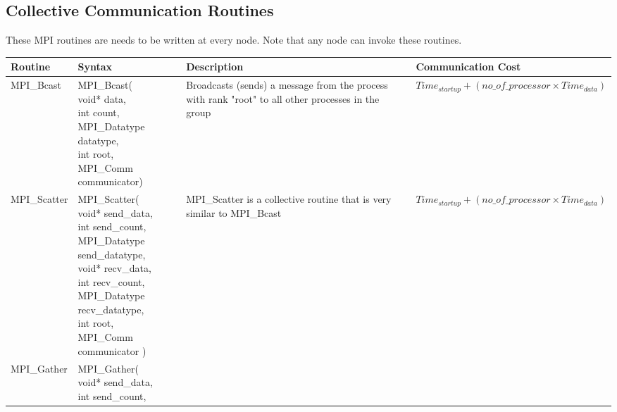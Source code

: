 \subsection{Collective Communication Routines}
These MPI routines are needs to be written at every node. Note that any node can invoke these routines.
\begin{table}[h]
    \hspace{-2cm}
    \begin{tabular}{l | p{5.5cm} | p{5cm} | p{4cm}}
         \textbf{Routine} &  \textbf{Syntax} & \textbf{Description} & \textbf{Communication Cost}
         \\ \hline
         \hline 
            MPI\_Bcast
            & \makecell[tl]{
            MPI\_Bcast(
                \\ void* data,
                \\ int count,
                \\ MPI\_Datatype datatype,
                \\ int root,
                \\ MPI\_Comm communicator)
            }
            & Broadcasts (sends) a message from the process with rank "root" to all other processes in the group
            & $ Time_{startup} + (no\_of\_processor \times Time_{data}) $
        \\ \hline
            MPI\_Scatter
            & \makecell[tl]{
                MPI\_Scatter(
                    \\ void* send\_data,
                    \\ int send\_count,
                    \\ MPI\_Datatype send\_datatype,
                    \\ void* recv\_data,
                    \\ int recv\_count,
                    \\ MPI\_Datatype recv\_datatype,
                    \\ int root,
                    \\ MPI\_Comm communicator
                )
            }
            & MPI\_Scatter is a collective routine that is very similar to MPI\_Bcast
            & $ Time_{startup} + (no\_of\_processor \times Time_{data}) $
        \\ \hline
            MPI\_Gather
            & \makecell[tl]{
            MPI\_Gather(
                \\ void* send\_data,
                \\ int send\_count,
}
\end{tabular}
\end{table}
